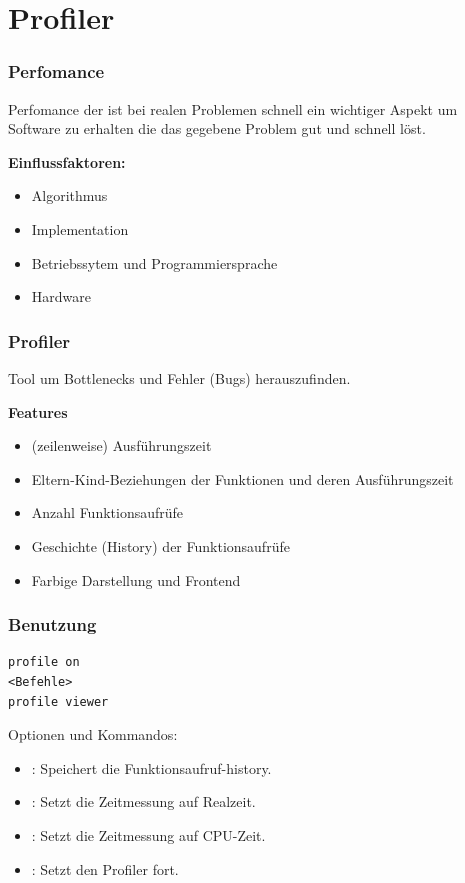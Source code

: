 \documentclass[hyperref={xetex}]{beamer}
\begin{document}
\section{Profiler}

\begin{frame}[fragile]\frametitle{Perfomance}

Perfomance der ist bei realen Problemen schnell ein wichtiger Aspekt um Software zu erhalten die das gegebene Problem gut und schnell löst.

\textbf{Einflussfaktoren:}
\begin{itemize}
 \item Algorithmus
 \item \alert{Implementation}
 \item Betriebssytem und Programmiersprache
 \item Hardware
\end{itemize}

\end{frame}

\begin{frame}[fragile]\frametitle{Profiler}
Tool um Bottlenecks und Fehler (Bugs) herauszufinden.

\textbf{Features}
\begin{itemize}
 \item (zeilenweise) Ausführungszeit
\item Eltern-Kind-Beziehungen der Funktionen und deren Ausführungszeit
 \item Anzahl Funktionsaufrüfe
\item Geschichte (History) der Funktionsaufrüfe
\item Farbige Darstellung und Frontend
\end{itemize}

\end{frame}

\begin{frame}[fragile]\frametitle{Benutzung}
\begin{lstlisting}
profile on 
<Befehle>
profile viewer
\end{lstlisting}
Optionen und Kommandos:
\begin{itemize}
 \item {}: Speichert die Funktionsaufruf-history.
 \item {}: Setzt die Zeitmessung auf Realzeit.
\item {}: Setzt die Zeitmessung auf CPU-Zeit.
 \item {}: Setzt den Profiler fort.
\end{itemize}

\end{frame}
\end{document}
